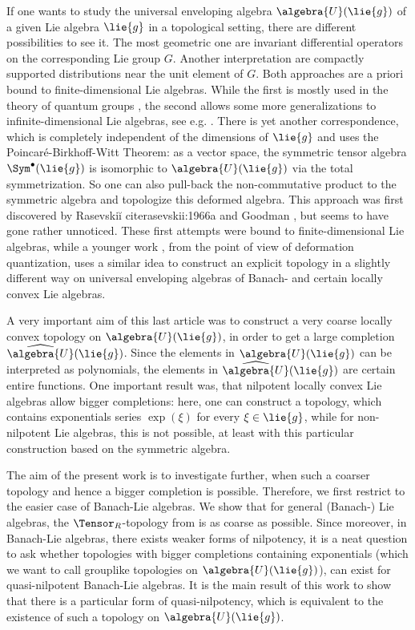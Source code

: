 \documentclass[
11pt,                          %
english                        %
]{article}
\begin{document}
If one wants to study the universal enveloping algebra $\algebra{U}(\lie{g})$ of a 
given Lie algebra $\lie{g}$ in a topological setting, there are different 
possibilities to see it. The most geometric one are invariant differential operators 
on the corresponding Lie group $G$. Another interpretation are compactly supported 
distributions near the unit element of $G$. Both approaches are a priori bound to 
finite-dimensional Lie algebras. While the first is mostly used in the theory of 
quantum groups \cite{pflaum.schottenloher:1998a}, the second allows some more 
generalizations to infinite-dimensional Lie algebras, see e.g. 
\cite{beltita.nicolae:2015a}. There is yet another correspondence, which is 
completely independent of the dimensions of $\lie{g}$ and uses the 
Poincar\'e-Birkhoff-Witt Theorem: as a vector space, the symmetric tensor algebra 
$\Sym^{\bullet}(\lie{g})$ is isomorphic to $\algebra{U}(\lie{g})$ via the total 
symmetrization. So one can also pull-back the non-commutative product to the 
symmetric algebra and topologize this deformed algebra. This approach was first 
discovered by Rasevski{\u i} cite{rasevskii:1966a} and Goodman \cite{goodman:1971a}, 
but seems to have gone rather unnoticed. These first attempts were bound to 
finite-dimensional Lie algebras, while a younger work 
\cite{esposito.stapor.waldmann:2015a:pre}, from the point of view of deformation 
quantization, uses a similar idea to construct an explicit topology in a slightly 
different way on universal enveloping algebras of Banach- and certain locally convex 
Lie algebras.

A very important aim of this last article was to construct a very coarse locally 
convex topology on $\algebra{U}(\lie{g})$, in order to get a large completion 
$\widehat{\algebra{U}}(\lie{g})$. Since the elements in $\algebra{U}(\lie{g})$ can be 
interpreted as polynomials, the elements in $\widehat{\algebra{U}}(\lie{g})$ are 
certain entire functions. One important result was, that nilpotent locally convex Lie 
algebras allow bigger completions: here, one can construct a topology, which contains 
exponentials series $\exp(\xi)$ for every $\xi \in \lie{g}$, while for non-nilpotent 
Lie algebras, this is not possible, at least with this particular construction based 
on the symmetric algebra.

The aim of the present work is to investigate further, when such a coarser topology 
and hence a bigger completion is possible. Therefore, we first restrict to the easier 
case of Banach-Lie algebras. We show that for general (Banach-) Lie algebras, the 
$\Tensor_R$-topology from \cite{esposito.stapor.waldmann:2015a:pre} is as coarse as 
possible. Since moreover, in Banach-Lie algebras, there exists weaker forms of 
nilpotency, it is a neat question to ask whether topologies with bigger completions 
containing exponentials (which we want to call grouplike topologies on $\algebra{U}
(\lie{g})$), can exist for quasi-nilpotent Banach-Lie algebras. It is the main result 
of this work to show that there is a particular form of quasi-nilpotency, which is 
equivalent to the existence of such a topology on $\algebra{U}(\lie{g})$.
\end{document}
